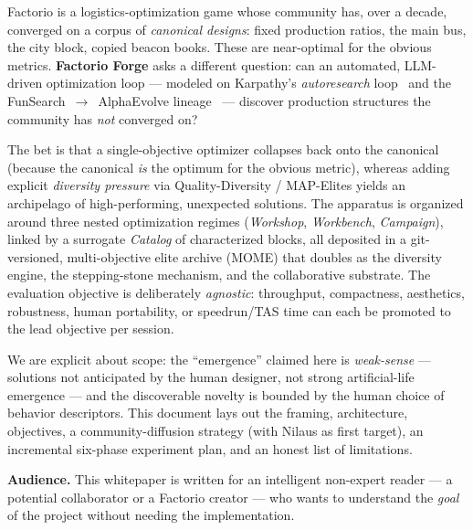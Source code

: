 \documentclass[11pt,a4paper]{article}
\begin{document}
Factorio is a logistics-optimization game whose community has, over a decade,
converged on a corpus of \emph{canonical designs}: fixed production ratios, the
main bus, the city block, copied beacon books. These are near-optimal for the
obvious metrics. \textbf{Factorio Forge} asks a different question: can an
automated, LLM-driven optimization loop --- modeled on Karpathy's
\emph{autoresearch} loop~\cite{karpathy_autoresearch} and the
FunSearch~$\rightarrow$~AlphaEvolve lineage~\cite{alphaevolve_arxiv} --- discover
production structures the community has \emph{not} converged on?

The bet is that a single-objective optimizer collapses back onto the canonical
(because the canonical \emph{is} the optimum for the obvious metric), whereas
adding explicit \emph{diversity pressure} via Quality-Diversity / MAP-Elites
\cite{mapelites_emergentmind,qd_reference} yields an archipelago of
high-performing, unexpected solutions. The apparatus is organized around three
nested optimization regimes (\emph{Workshop}, \emph{Workbench}, \emph{Campaign}),
linked by a surrogate \emph{Catalog} of characterized blocks, all deposited in a
git-versioned, multi-objective elite archive (MOME) that doubles as the diversity
engine, the stepping-stone mechanism, and the collaborative substrate. The
evaluation objective is deliberately \emph{agnostic}: throughput, compactness,
aesthetics, robustness, human portability, or speedrun/TAS time can each be
promoted to the lead objective per session.

We are explicit about scope: the ``emergence'' claimed here is \emph{weak-sense}
--- solutions not anticipated by the human designer, not strong artificial-life
emergence --- and the discoverable novelty is bounded by the human choice of
behavior descriptors. This document lays out the framing, architecture,
objectives, a community-diffusion strategy (with Nilaus as first target), an
incremental six-phase experiment plan, and an honest list of limitations.

\vspace{0.4cm}
{\small\color{forgeAsh}\textbf{Audience.} This whitepaper is written for an
intelligent non-expert reader --- a potential collaborator or a Factorio creator
--- who wants to understand the \emph{goal} of the project without needing the
implementation.}

\newpage
\tableofcontents
\newpage
\listoffigures
\listoftables
\newpage

\end{document}

